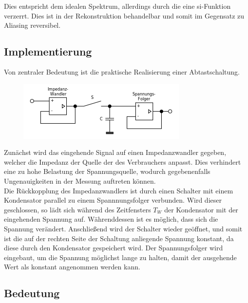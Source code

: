 Dies entspricht dem idealen Spektrum, allerdings durch die eine si-Funktion verzerrt. Dies ist in der Rekonstruktion behandelbar und somit im Gegensatz zu Aliasing reversibel.\\

\subsection{Implementierung}
Von zentraler Bedeutung ist die praktische Realisierung einer Abtastschaltung.

\begin{figure}[h!]
\centering
\includegraphics[scale=0.6]{images/abtastung_schaltung.png}
\label{sah_schaltung}
\end{figure}

Zunächst wird das eingehende Signal auf einen Impedanzwandler gegeben, welcher die Impedanz der Quelle der des Verbrauchers anpasst. Dies verhindert eine zu hohe Belastung der Spannungsquelle, wodurch gegebenenfalls Ungenauigkeiten in der Messung auftreten können.\\
Die Rückkopplung des Impedanzwandlers ist durch einen Schalter mit einem Kondensator parallel zu einem Spannnungsfolger verbunden. Wird dieser geschlossen, so lädt sich während des Zeitfensters $T_W$ der Kondensator mit der eingehenden Spannung auf. Währenddessen ist es möglich, dass sich die Spannung verändert. Anschließend wird der Schalter wieder geöffnet, und somit ist die auf der rechten Seite der Schaltung anliegende Spannung konstant, da diese durch den Kondensator gespeichert wird. Der Spannungsfolger wird eingebaut, um die Spannung möglichst lange zu halten, damit der ausgehende Wert als konstant angenommen werden kann. 

\subsection{Bedeutung}\label{3.3}

